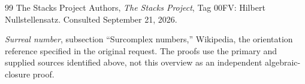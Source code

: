 \documentclass[11pt,letterpaper]{article}
\numberwithin{equation}{section}
\theoremstyle{definition}
\theoremstyle{remark}\newtheorem{remark}[theorem]{Remark}
\begin{document}
\begin{thebibliography}{99}
The Stacks Project Authors, \emph{The Stacks Project}, Tag 00FV: Hilbert
Nullstellensatz. Consulted September 21, 2026.

\emph{Surreal number}, subsection ``Surcomplex numbers,'' Wikipedia, the
orientation reference specified in the original request. The proofs use the
primary and supplied sources identified above, not this overview as an
independent algebraic-closure proof.
\end{thebibliography}
\end{document}
